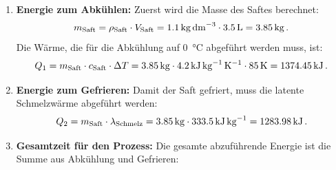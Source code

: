 \documentclass[ngerman]{scrreprt}
\newenvironment{loesungbox}[1]
  {\needspace{5\baselineskip}\begin{loesungboxstyle}[frametitle={#1}]}
  {\end{loesungboxstyle}}
\begin{document}
\begin{loesungbox}{Lösung zu \Cref{aufg:saft_tk}}
\begin{enumerate}
\begin{center}
    \end{center}
    \item \textbf{Energie zum Abkühlen:}
    Zuerst wird die Masse des Saftes berechnet:
    \begin{equation}\label{eq: saft_masse}
        m_{\text{Saft}} = \rho_{\text{Saft}} \cdot V_{\text{Saft}} = \SI{1.1}{\kilogram\per\deci\metre\cubed} \cdot \SI{3.5}{\litre} = \SI{3.85}{\kilogram} \mDot
    \end{equation}
    Die Wärme, die für die Abkühlung auf \SI{0}{\degreeCelsius} abgeführt werden muss, ist:
    \begin{equation}\label{eq: saft_q1}
        Q_{1} = m_{\text{Saft}} \cdot c_{\text{Saft}} \cdot \Delta T = \SI{3.85}{\kg} \cdot \SI{4.2}{\kilo\joule\per\kilogram\per\kelvin} \cdot \SI{85}{\kelvin} = \SI{1374.45}{\kilo\joule} \mDot
    \end{equation}
    \item \textbf{Energie zum Gefrieren:}
    Damit der Saft gefriert, muss die latente Schmelzwärme abgeführt werden:
    \begin{equation}\label{eq: saft_q2}
        Q_{2} = m_{\text{Saft}} \cdot \lambda_{\text{Schmelz}} = \SI{3.85}{\kg} \cdot \SI{333.5}{\kilo\joule\per\kilogram} = \SI{1283.98}{\kilo\joule} \mDot
    \end{equation}
    \item \textbf{Gesamtzeit für den Prozess:}
    Die gesamte abzuführende Energie ist die Summe aus Abkühlung und Gefrieren:
    \begin{equation}\label{eq: saft_q_ges}

\end{equation}
\end{enumerate}
\end{loesungbox}
\end{document}
